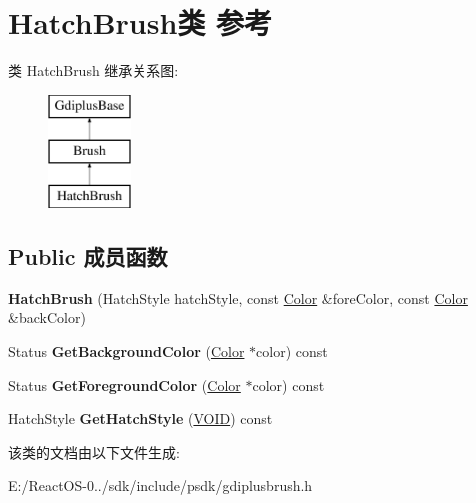 \hypertarget{class_hatch_brush}{}\section{Hatch\+Brush类 参考}
\label{class_hatch_brush}
类 Hatch\+Brush 继承关系图\+:\begin{figure}[H]
\begin{center}
\leavevmode
\includegraphics[height=3.000000cm]{class_hatch_brush}
\end{center}
\end{figure}
\subsection*{Public 成员函数}
\begin{DoxyCompactItemize}
\item 
\mbox{\label{class_hatch_brush_a8b24d97682b525205240ce83f756f653}} 
{\bfseries Hatch\+Brush} (Hatch\+Style hatch\+Style, const \hyperlink{struct_color}{Color} \&fore\+Color, const \hyperlink{struct_color}{Color} \&back\+Color)
\item 
\mbox{\label{class_hatch_brush_a540b04b246d3fc1b85e3b060c7992a0b}} 
Status {\bfseries Get\+Background\+Color} (\hyperlink{struct_color}{Color} $\ast$color) const
\item 
\mbox{\label{class_hatch_brush_adcc5a3db9fd66a55d20095cd863f6eef}} 
Status {\bfseries Get\+Foreground\+Color} (\hyperlink{struct_color}{Color} $\ast$color) const
\item 
\mbox{\label{class_hatch_brush_aae035bb6a163c52332976a3a9181ab07}} 
Hatch\+Style {\bfseries Get\+Hatch\+Style} (\hyperlink{interfacevoid}{V\+O\+ID}) const
\end{DoxyCompactItemize}


该类的文档由以下文件生成\+:\begin{DoxyCompactItemize}
\item 
E\+:/\+React\+O\+S-\/0../sdk/include/psdk/gdiplusbrush.\+h\end{DoxyCompactItemize}
